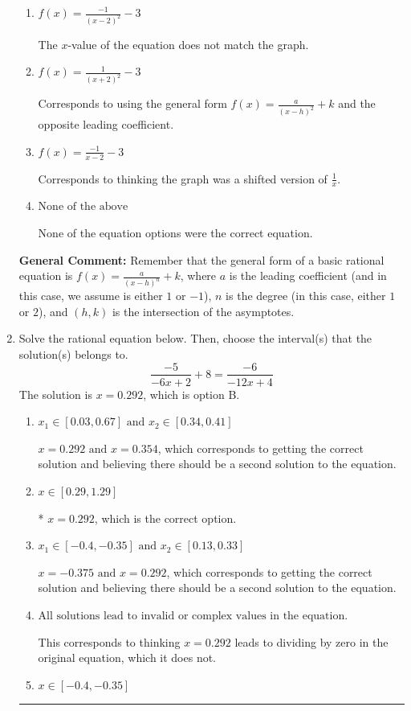 \documentclass{extbook}[14pt]
\newcommand{\litem}[1]{\item #1

\rule{\textwidth}{0.4pt}}
\begin{document}
\begin{enumerate}
{\begin{enumerate}[label=\Alph*.]
Corresponds to thinking the graph was a shifted version of $\frac{1}{x}$, using the general form $f(x) = \frac{a}{(x-h)^2}+k$, and the opposite leading coefficient.
\item \( f(x) = \frac{-1}{(x - 2)^2} - 3 \)

The $x$-value of the equation does not match the graph.
\item \( f(x) = \frac{1}{(x + 2)^2} - 3 \)

Corresponds to using the general form $f(x) = \frac{a}{(x-h)^2}+k$ and the opposite leading coefficient.
\item \( f(x) = \frac{-1}{x - 2} - 3 \)

Corresponds to thinking the graph was a shifted version of $\frac{1}{x}$.
\item \( \text{None of the above} \)

None of the equation options were the correct equation.
\end{enumerate}

\textbf{General Comment:} Remember that the general form of a basic rational equation is $ f(x) = \frac{a}{(x-h)^n} + k$, where $a$ is the leading coefficient (and in this case, we assume is either $1$ or $-1$), $n$ is the degree (in this case, either $1$ or $2$), and $(h, k)$ is the intersection of the asymptotes.
}
\litem{
Solve the rational equation below. Then, choose the interval(s) that the solution(s) belongs to.
\[ \frac{-5}{-6x + 2} + 8 = \frac{-6}{-12x + 4} \]The solution is \( x = 0.292 \), which is option B.\begin{enumerate}[label=\Alph*.]
\item \( x_1 \in [0.03, 0.67] \text{ and } x_2 \in [0.34,0.41] \)

$x = 0.292 \text{ and } x = 0.354$, which corresponds to getting the correct solution and believing there should be a second solution to the equation.
\item \( x \in [0.29,1.29] \)

* $x = 0.292$, which is the correct option.
\item \( x_1 \in [-0.4, -0.35] \text{ and } x_2 \in [0.13,0.33] \)

$x = -0.375 \text{ and } x = 0.292$, which corresponds to getting the correct solution and believing there should be a second solution to the equation.
\item \( \text{All solutions lead to invalid or complex values in the equation.} \)

This corresponds to thinking $x = 0.292$ leads to dividing by zero in the original equation, which it does not.
\item \( x \in [-0.4,-0.35] \)


\end{enumerate}}
\end{enumerate}
\end{document}
